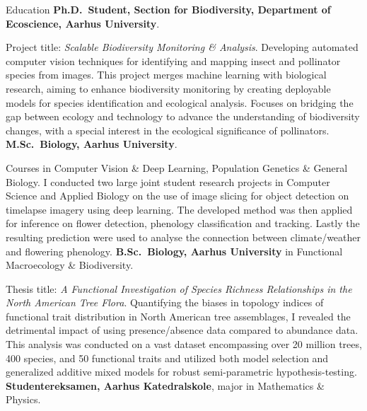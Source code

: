\begin{rubric}{Education}
\entry*[2023 -- \ldots]
    \textbf{Ph.D.~Student, Section for Biodiversity, Department of Ecoscience, Aarhus University}. \par
    \pind Project title: \textit{Scalable Biodiversity Monitoring \& Analysis}. Developing automated computer vision techniques for identifying and mapping insect and pollinator species from images. This project merges machine learning with biological research, aiming to enhance biodiversity monitoring by creating deployable models for species identification and ecological analysis. Focuses on bridging the gap between ecology and technology to advance the understanding of biodiversity changes, with a special interest in the ecological significance of pollinators.
%
\entry*[2022 -- 2025]%
	\textbf{M.Sc.~Biology, Aarhus University}.\par
    \pind Courses in Computer Vision \& Deep Learning, Population Genetics \& General Biology. I conducted two large joint student research projects in Computer Science and Applied Biology on the use of image slicing for object detection on timelapse imagery using deep learning. The developed method was then applied for inference on flower detection, phenology classification and tracking. Lastly the resulting prediction were used to analyse the connection between climate/weather and flowering phenology.
%
\entry*[2019 -- 2022]%
	\textbf{B.Sc.~Biology, Aarhus University} in Functional Macroecology \& Biodiversity.\par
	\pind Thesis title: \emph{A Functional Investigation of Species Richness Relationships in the North American Tree Flora}. Quantifying the biases in topology indices of functional trait distribution in North American tree assemblages, I revealed the detrimental impact of using presence/absence data compared to abundance data. This analysis was conducted on a vast dataset encompassing over 20 million trees, 400 species, and 50 functional traits and utilized both model selection and generalized additive mixed models for robust semi-parametric hypothesis-testing.
%
\entry*[2015 -- 2018]%
    \textbf{Studentereksamen, Aarhus Katedralskole}, major in Mathematics \& Physics.\par
%
\end{rubric}